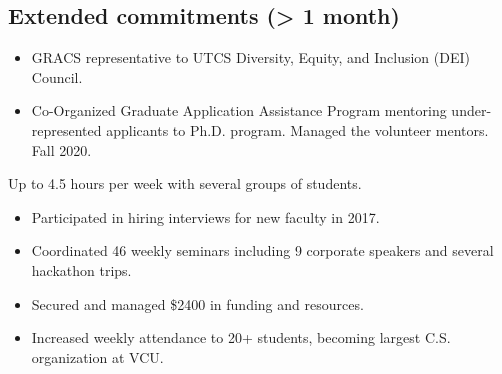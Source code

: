 \documentclass[11pt,letterpaper,serif]{moderncv}
\begin{document}


\smallskip
\subsection{Extended commitments (> 1 month)}

{
	\begin{adjustwidth}{.25in}{}
		\begin{itemize}
			\item GRACS representative to UTCS Diversity, Equity, and Inclusion (DEI) Council.
			\item Co-Organized Graduate Application Assistance Program mentoring under-represented applicants to Ph.D. program. Managed the volunteer mentors. Fall 2020.
		\end{itemize}
	\end{adjustwidth}
}

{
	\begin{adjustwidth}{.25in}{}
		Up to 4.5 hours per week with several groups of students.
	\end{adjustwidth}
}

{
	\begin{adjustwidth}{.25in}{}
		\begin{itemize}
			\item Participated in hiring interviews for new faculty in 2017.
		\end{itemize}
	\end{adjustwidth}
}

{
	\begin{adjustwidth}{.25in}{}
		\begin{itemize}
			\item Coordinated 46 weekly seminars including 9 corporate speakers and several hackathon trips.
			\item Secured and managed \$2400 in funding and resources.
			\item Increased weekly attendance to 20+ students, becoming largest C.S. organization at VCU.
		\end{itemize}
	\end{adjustwidth}
}
\end{document}
